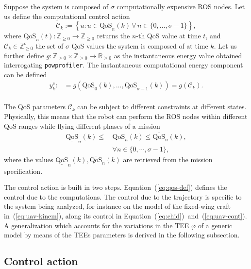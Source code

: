 \documentclass[letterpaper,10pt,conference]{ieeeconf}
\newcommand{\stt}[1]{{\small\tt #1}} %
\newcommand{\powprof}{\stt{powprofiler}}
\begin{document}
Suppose the system is composed of $\sigma$ computationally expensive ROS nodes. Let us define the computational control action
\begin{equation}\label{eq:qos-def}
  \mathcal{C}_k:=\left\{u:u\in\text{QoS}_n(k)\,\forall\,n\in\{0,\dots,\sigma-1\}\right\},
\end{equation}
where $\text{QoS}_n(t):\mathbb{Z}_{\geq 0}\rightarrow\mathbb{Z}_{\geq 0}$ returns the $n$-th QoS value at time $t$, and $\mathcal{C}_k\in\mathbb{Z}_{\geq 0}^\sigma$ the set of $\sigma$ QoS values the system is composed of at time $k$. Let us further define $g:\mathbb{Z}_{\geq 0}\times\mathbb{Z}_{\geq 0}\rightarrow\mathbb{R}_{\geq 0}$ as the instantaneous energy value obtained interrogating \powprof{}. The instantaneous computational energy component can be defined
\begin{equation}\label{eq:energy-comp}\begin{split}
  y_k^c:&=g\left(\text{QoS}_0\left(k\right),\dots,\text{QoS}_{\sigma-1}\left(k\right)\right)=g\left(\mathcal{C}_{k}\right).\\
\end{split}\end{equation}

The QoS parameters $\mathcal{C}_k$ can be subject to different constraints at different states. Physically, this means that the robot can perform the ROS nodes within different QoS ranges while flying different phases of a mission
\begin{equation}\label{eq:qos-lims}\begin{split}
  \underline{\text{QoS}}_n(k)\leq \,&\text{QoS}_n(k)\leq \overline{\text{QoS}}_n(k),\\
  &\forall n\in\{0,\cdots,\sigma-1\},
\end{split}\end{equation}
where the values $\underline{\text{QoS}}_n(k),\overline{\text{QoS}}_n(k)$ are retrieved from the mission specification.

The control action is built in two steps. Equation~(\ref{eq:qos-def}) defines the control due to the computations. The control due to the trajectory is specific to the system being analyzed, for instance on the model of the fixed-wing craft in~(\ref{eq:uav-kinem}), along its control in Equation~(\ref{eq:chid})~and~(\ref{eq:uav-cont}). A generalization which accounts for the variations in the TEE $\varphi$ of a generic model by means of the TEEs parameters is derived in the following subsection.

\subsection{Control action}
\label{sec:control-action}
\end{document}
